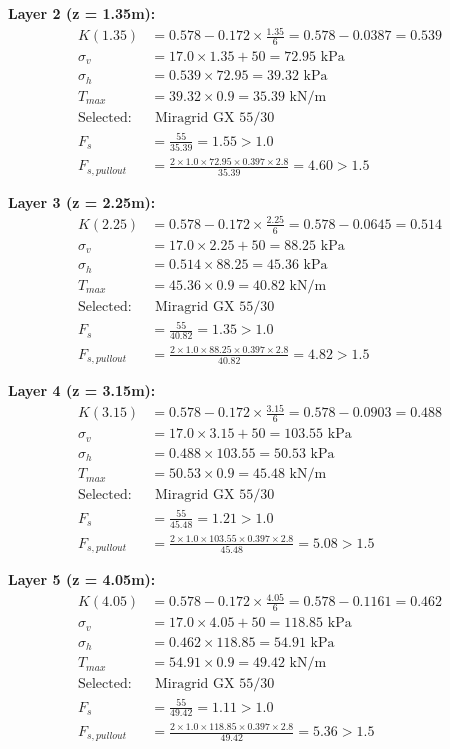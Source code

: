 \documentclass[10pt,a4paper,twocolumn]{article}
\begin{document}
\textbf{Layer 2 (z = 1.35m):}
\begin{align}
K(1.35) &= 0.578 - 0.172 \times \frac{1.35}{6} = 0.578 - 0.0387 = 0.539 \\
\sigma_v &= 17.0 \times 1.35 + 50 = 72.95 \text{ kPa} \\
\sigma_h &= 0.539 \times 72.95 = 39.32 \text{ kPa} \\
T_{max} &= 39.32 \times 0.9 = 35.39 \text{ kN/m} \\
\text{Selected:} &\text{ Miragrid GX 55/30} \\
F_s &= \frac{55}{35.39} = 1.55 > 1.0\\
F_{s,pullout} &= \frac{2 \times 1.0 \times 72.95 \times 0.397 \times 2.8}{35.39} = 4.60 > 1.5
\end{align}

\textbf{Layer 3 (z = 2.25m):}
\begin{align}
K(2.25) &= 0.578 - 0.172 \times \frac{2.25}{6} = 0.578 - 0.0645 = 0.514 \\
\sigma_v &= 17.0 \times 2.25 + 50 = 88.25 \text{ kPa} \\
\sigma_h &= 0.514 \times 88.25 = 45.36 \text{ kPa} \\
T_{max} &= 45.36 \times 0.9 = 40.82 \text{ kN/m} \\
\text{Selected:} &\text{ Miragrid GX 55/30} \\
F_s &= \frac{55}{40.82} = 1.35 > 1.0 \\
F_{s,pullout} &= \frac{2 \times 1.0 \times 88.25 \times 0.397 \times 2.8}{40.82} = 4.82 > 1.5
\end{align}

\textbf{Layer 4 (z = 3.15m):}
\begin{align}
K(3.15) &= 0.578 - 0.172 \times \frac{3.15}{6} = 0.578 - 0.0903 = 0.488 \\
\sigma_v &= 17.0 \times 3.15 + 50 = 103.55 \text{ kPa} \\
\sigma_h &= 0.488 \times 103.55 = 50.53 \text{ kPa} \\
T_{max} &= 50.53 \times 0.9 = 45.48 \text{ kN/m} \\
\text{Selected:} &\text{ Miragrid GX 55/30} \\
F_s &= \frac{55}{45.48} = 1.21 > 1.0\\
F_{s,pullout} &= \frac{2 \times 1.0 \times 103.55 \times 0.397 \times 2.8}{45.48} = 5.08 > 1.5
\end{align}

\textbf{Layer 5 (z = 4.05m):}
\begin{align}
K(4.05) &= 0.578 - 0.172 \times \frac{4.05}{6} = 0.578 - 0.1161 = 0.462 \\
\sigma_v &= 17.0 \times 4.05 + 50 = 118.85 \text{ kPa} \\
\sigma_h &= 0.462 \times 118.85 = 54.91 \text{ kPa} \\
T_{max} &= 54.91 \times 0.9 = 49.42 \text{ kN/m} \\
\text{Selected:} &\text{ Miragrid GX 55/30} \\
F_s &= \frac{55}{49.42} = 1.11 > 1.0\\
F_{s,pullout} &= \frac{2 \times 1.0 \times 118.85 \times 0.397 \times 2.8}{49.42} = 5.36 > 1.5
\end{align}
\end{document}
